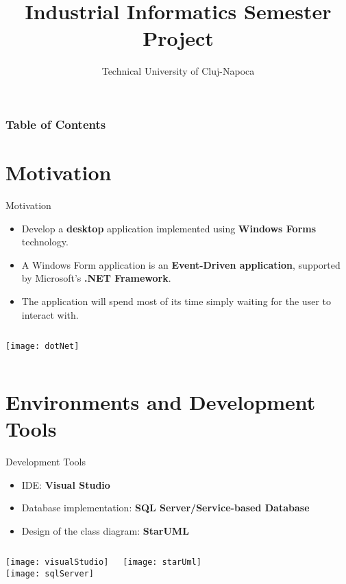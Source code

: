 \documentclass{beamer}
\title{Industrial Informatics Semester Project}
\subtitle{Technical University of Cluj-Napoca}
\author[Technical University of Cluj-Napoca]{%
	\texorpdfstring{%
		\begin{columns}
			\column{.5\linewidth}
			\centering
			Achim Daniel \\ Băltărețu Teodor-Stelian \\ Bugnariu Vlad \\ Ciobotaru Alexandru
			\column{.5\linewidth}
			\centering
			Fildan Claudiu \\ Furdui Vasile Teodor \\ Gog Ionela-Maria
		\end{columns}
	}
	{Author 1, Author 2, Author 3}
}
\begin{document}
	\maketitle
	
    \begin{frame}
    	\frametitle{Table of Contents}
    	\tableofcontents
    \end{frame}	


\section{Motivation}

\begin{frame}{Motivation}
	\begin{itemize}
		\item Develop a \textbf{desktop} application implemented using \textbf{Windows Forms} technology.
		\item A Windows Form application is an \textbf{Event-Driven application}, supported by Microsoft's \textbf{.NET Framework}.
		\item The application will spend most of its time simply waiting for the user to interact with.
	\end{itemize}

\begin{columns}
	\texttt{[image: dotNet]}
\end{columns}

\end{frame}



\section{Environments and Development Tools} %

\begin{frame}{Development Tools}
	
	\begin{itemize}
		\item IDE: \textbf{Visual Studio}
		\item Database implementation: \textbf{SQL Server/Service-based Database}
		\item Design of the class diagram: \textbf{StarUML} 
	\end{itemize}

\begin{columns}
	\centering
	\texttt{[image: visualStudio]} \\ \texttt{[image: sqlServer]}

	\centering
	\texttt{[image: starUml]}
\end{columns}

\end{frame}
\end{document}
